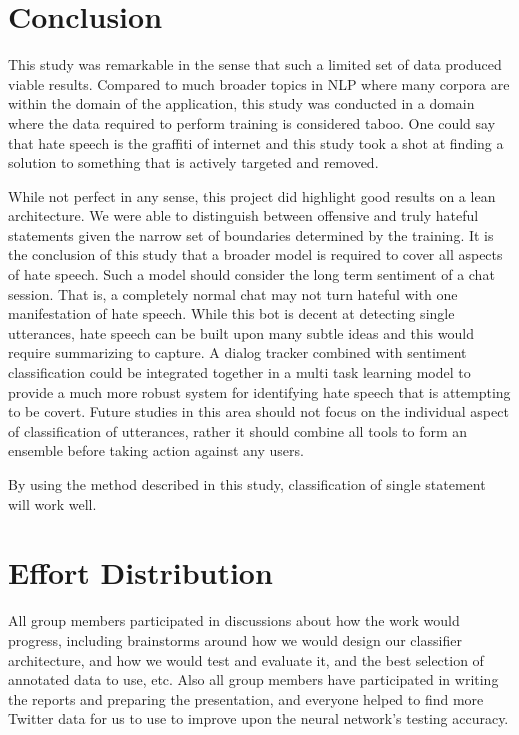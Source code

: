 \documentclass[conference]{sig-alternate-05-2015}
\begin{document}
\section{Conclusion}

This study was remarkable in the sense that such a limited set of data produced viable results.  Compared to much broader topics in NLP where many corpora are within the domain of the application, this study was conducted in a domain where the data required to perform training is considered taboo.  One could say that hate speech is the graffiti of internet and this study took a shot at finding a solution to something that is actively targeted and removed.

While not perfect in any sense, this project did highlight good results on a lean architecture.  We were able to distinguish between offensive and truly hateful statements given the narrow set of boundaries determined by the training.  It is the conclusion of this study that a broader model is required to cover all aspects of hate speech.  Such a model should consider the long term sentiment of a chat session.  That is, a completely normal chat may not turn hateful with one manifestation of hate speech.  While this bot is decent at detecting single utterances, hate speech can be built upon many subtle ideas and this would require summarizing to capture.  A dialog tracker combined with sentiment classification could be integrated together in a multi task learning model to provide a much more robust system for identifying hate speech that is attempting to be covert.  Future studies in this area should not focus on the individual aspect of classification of utterances, rather it should combine all tools to form an ensemble before taking action against any users.

By using the method described in this study, classification of single statement will work well.  


\section{Effort Distribution}




All group members participated in discussions about how the work would progress, including brainstorms around how we would design our classifier architecture, and how we would test and evaluate it, and the best selection of annotated data to use, etc. Also all group members have participated in writing the reports and preparing the presentation, and everyone helped to find more Twitter data for us to use to improve upon the neural network's testing accuracy.
\end{document}
